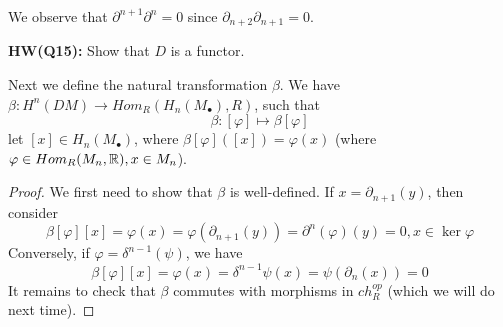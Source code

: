 We observe that $\partial^{n+1}\partial^n=0$ since $\partial_{n+2}\partial_{n+1}=0$.
\begin{prob}
    \textbf{HW(Q15):} Show that $D$ is a functor.
\end{prob}
Next we define the natural transformation $\beta$. We have $\beta: H^n(DM)\to Hom_R(H_n(M_\bullet),R)$, such that 
\begin{equation*}
    \beta: [\varphi]\mapsto \beta[\varphi]
\end{equation*}
let $[x]\in H_n(M_\bullet)$, where $\beta[\varphi]([x])=\varphi(x)$ (where $\varphi\in Hom_R(M_n,\mathbb{R}), x\in M_n$).
\begin{proof}
    We first need to show that $\beta$ is well-defined. If $x=\partial_{n+1}(y)$, then consider 
    \begin{equation*}
        \beta[\varphi][x]=\varphi(x)=\varphi(\partial_{n+1}(y))=\partial^n(\varphi)(y)=0, x\in\ker\varphi
    \end{equation*}
    Conversely, if $\varphi=\delta^{n-1}(\psi)$, we have 
    \begin{equation*}
        \beta[\varphi][x]=\varphi(x)=\delta^{n-1}\psi(x)=\psi(\partial_n(x))=0
    \end{equation*}
    It remains to check that $\beta$ commutes with morphisms in $ch_R^{op}$ (which we will do next time).
\end{proof}


